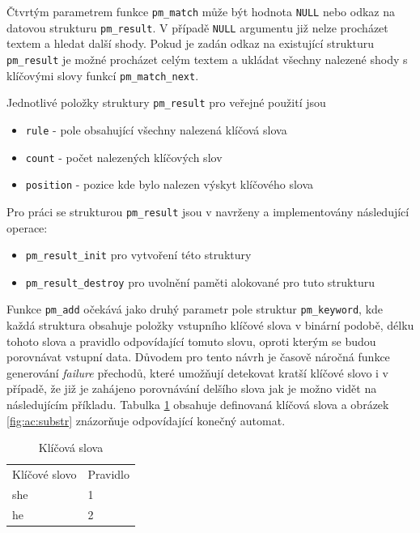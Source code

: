 Čtvrtým parametrem funkce \texttt{pm\_match} může být hodnota \texttt{NULL} nebo odkaz na datovou strukturu
\texttt{pm\_result}. V případě \texttt{NULL} argumentu již nelze procházet textem a hledat další shody.
Pokud je zadán odkaz na existující strukturu \texttt{pm\_result} je možné procházet celým textem a ukládat
všechny nalezené shody s klíčovými slovy funkcí \texttt{pm\_match\_next}.

Jednotlivé položky struktury \texttt{pm\_result} pro veřejné použití jsou

\begin{itemize}
    \item{\texttt{rule} - pole obsahující všechny nalezená klíčová slova}
    \item{\texttt{count} - počet nalezených klíčových slov}
    \item{\texttt{position} - pozice kde bylo nalezen výskyt klíčového slova}
\end{itemize}

Pro práci se strukturou \texttt{pm\_result} jsou v navrženy a implementovány následující operace:

\begin{itemize}
    \item{\texttt{pm\_result\_init} pro vytvoření této struktury}
    \item{\texttt{pm\_result\_destroy} pro uvolnění paměti alokované pro tuto strukturu}
\end{itemize}


Funkce \texttt{pm\_add} očekává jako druhý parametr pole struktur \texttt{pm\_keyword}, kde každá struktura
obsahuje položky vstupního klíčové slova v binární podobě, délku tohoto slova a pravidlo odpovídající tomuto slovu, oproti kterým se budou porovnávat vstupní data. Důvodem pro tento návrh je časově náročná funkce generování
\textit{failure} přechodů, které umožňují detekovat kratší klíčové slovo i v případě, že již je
zahájeno porovnávání delšího slova jak je možno vidět na následujícím příkladu. Tabulka \ref{tab:ac:substr}
obsahuje definovaná klíčová slova a obrázek \ref{fig:ac:substr} znázorňuje odpovídající konečný automat.

\begin{table}[!htbp]
    \center
    \begin{tabular}{|l|l|}
    \hline
    Klíčové slovo & Pravidlo \\ \hhline{|=|=|}
    she & 1  \\ \hline
    he & 2 \\ \hline
    \end{tabular}
    \caption{Klíčová slova}
    \label{tab:ac:substr}
\end{table}

